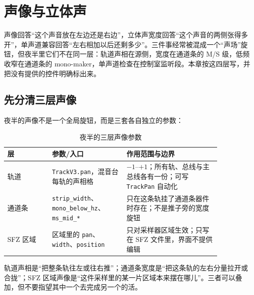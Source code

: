 \chapter{声像与立体声}
\label{chap:stereo-image}


声像回答“这个声音放在左边还是右边”，立体声宽度回答“这个声音的两侧张得多开”，单声道兼容回答“左右相加以后还剩多少”。三件事经常被混成一个“声场”旋钮，但夜半里它们不在同一层：轨道声相在源侧，宽度在通道条的 M/S 级，低频收窄在通道条的 mono-maker，单声道检查在控制室监听段。本章按这四层写，并把没有提供的控件明确标出来。

\section{先分清三层声像}

夜半的声像不是一个全局旋钮，而是三套各自独立的参数：

\begin{table}[htbp]
\centering
\small
\begin{tabular}{@{}p{0.18\linewidth}p{0.30\linewidth}p{0.38\linewidth}@{}}
\hline
层 & 参数/入口 & 作用范围与边界 \\
\hline
轨道 & \texttt{TrackV3.pan}，混音台每轨的声相格 & $-1$–$+1$；所有轨、总线与主总线各有一份；可写 \texttt{TrackPan} 自动化 \\
通道条 & \texttt{strip\_width}、\texttt{mono\_below\_hz}、\texttt{ms\_mid\_*} & 只在这条轨挂了通道条器件时存在；不是推子旁的宽度旋钮 \\
SFZ 区域 & 区域里的 \texttt{pan}、\texttt{width}、\texttt{position} & 只对采样器区域生效；只写在 SFZ 文件里，界面不提供编辑 \\
\hline
\end{tabular}
\caption{夜半的三层声像参数}
\label{tab:stereo-layers}
\end{table}

轨道声相是“把整条轨往左或往右推”；通道条宽度是“把这条轨的左右分量拉开或合拢”；SFZ 区域声像是“这件采样里的某一片区域本来摆在哪儿”。三者可以叠加，但不要指望其中一个去完成另一个的活。

